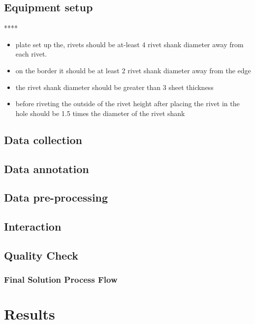 \documentclass{article}
\begin{document}
\subsection{Equipment setup}

    **** \cite{inbook} \begin{itemize}
        \item plate set up the, rivets should be at-least 4 rivet shank diameter away from each rivet.
        \item on the border it should be at least 2 rivet shank diameter away from the edge
        \item the rivet shank diameter should be greater than 3 sheet thickness
        \item before riveting the outside of the rivet height after placing the rivet in the hole should be 1.5 times the diameter of the rivet shank
        
    \end{itemize} 
    
\subsection{Data collection}
\subsection{Data annotation}
\subsection{Data pre-processing}

\subsection{Interaction}
\quad\quad
\subsection{Quality Check}
\subsubsection{Final Solution Process Flow}

\newpage










\section{Results}
\end{document}
